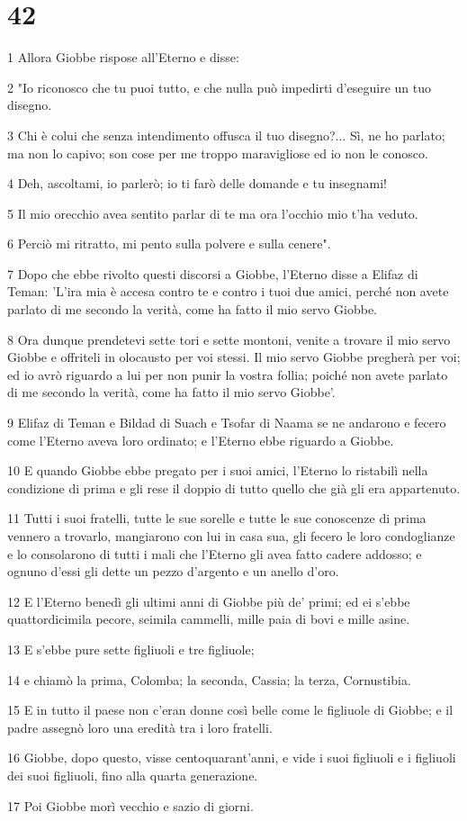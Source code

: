 \chapter{42}

\par 1 Allora Giobbe rispose all'Eterno e disse:
\par 2 "Io riconosco che tu puoi tutto, e che nulla può impedirti d'eseguire un tuo disegno.
\par 3 Chi è colui che senza intendimento offusca il tuo disegno?... Sì, ne ho parlato; ma non lo capivo; son cose per me troppo maravigliose ed io non le conosco.
\par 4 Deh, ascoltami, io parlerò; io ti farò delle domande e tu insegnami!
\par 5 Il mio orecchio avea sentito parlar di te ma ora l'occhio mio t'ha veduto.
\par 6 Perciò mi ritratto, mi pento sulla polvere e sulla cenere".
\par 7 Dopo che ebbe rivolto questi discorsi a Giobbe, l'Eterno disse a Elifaz di Teman: 'L'ira mia è accesa contro te e contro i tuoi due amici, perché non avete parlato di me secondo la verità, come ha fatto il mio servo Giobbe.
\par 8 Ora dunque prendetevi sette tori e sette montoni, venite a trovare il mio servo Giobbe e offriteli in olocausto per voi stessi. Il mio servo Giobbe pregherà per voi; ed io avrò riguardo a lui per non punir la vostra follia; poiché non avete parlato di me secondo la verità, come ha fatto il mio servo Giobbe'.
\par 9 Elifaz di Teman e Bildad di Suach e Tsofar di Naama se ne andarono e fecero come l'Eterno aveva loro ordinato; e l'Eterno ebbe riguardo a Giobbe.
\par 10 E quando Giobbe ebbe pregato per i suoi amici, l'Eterno lo ristabilì nella condizione di prima e gli rese il doppio di tutto quello che già gli era appartenuto.
\par 11 Tutti i suoi fratelli, tutte le sue sorelle e tutte le sue conoscenze di prima vennero a trovarlo, mangiarono con lui in casa sua, gli fecero le loro condoglianze e lo consolarono di tutti i mali che l'Eterno gli avea fatto cadere addosso; e ognuno d'essi gli dette un pezzo d'argento e un anello d'oro.
\par 12 E l'Eterno benedì gli ultimi anni di Giobbe più de' primi; ed ei s'ebbe quattordicimila pecore, seimila cammelli, mille paia di bovi e mille asine.
\par 13 E s'ebbe pure sette figliuoli e tre figliuole;
\par 14 e chiamò la prima, Colomba; la seconda, Cassia; la terza, Cornustibia.
\par 15 E in tutto il paese non c'eran donne così belle come le figliuole di Giobbe; e il padre assegnò loro una eredità tra i loro fratelli.
\par 16 Giobbe, dopo questo, visse centoquarant'anni, e vide i suoi figliuoli e i figliuoli dei suoi figliuoli, fino alla quarta generazione.
\par 17 Poi Giobbe morì vecchio e sazio di giorni.


